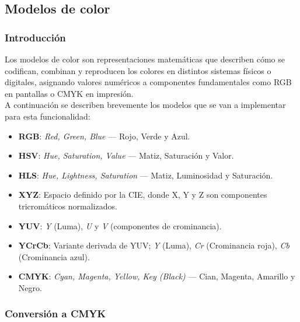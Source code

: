 \documentclass[11pt]{article}
\begin{document}
              \clearpage

  \subsection{Modelos de color}

      \subsubsection{Introducción}

          \noindent
          Los modelos de color son representaciones matemáticas que describen cómo se codifican, combinan y reproducen los colores en distintos sistemas físicos o digitales, asignando valores numéricos a componentes fundamentales como RGB en pantallas o CMYK en impresión. \\

          \noindent
          A continuación se describen brevemente los
          modelos que se van a implementar para esta funcionalidad:

          \begin{itemize}
              \item \textbf{RGB}: \textit{Red, Green, Blue} --- Rojo, Verde y Azul.

              \item \textbf{HSV}: \textit{Hue, Saturation, Value} --- Matiz, Saturación y Valor.

              \item \textbf{HLS}: \textit{Hue, Lightness, Saturation} --- Matiz, Luminosidad y Saturación.

              \item \textbf{XYZ}: Espacio definido por la CIE, donde X, Y y Z son componentes tricromáticos normalizados.

              \item \textbf{YUV}: \textit{Y} (Luma), \textit{U} y \textit{V} (componentes de crominancia).

              \item \textbf{YCrCb}: Variante derivada de YUV; \textit{Y} (Luma), \textit{Cr} (Crominancia roja), \textit{Cb} (Crominancia azul).

              \item \textbf{CMYK}: \textit{Cyan, Magenta, Yellow, Key (Black)} --- Cian, Magenta, Amarillo y Negro.
          \end{itemize}

      \subsubsection{Conversión a CMYK}
\end{document}
